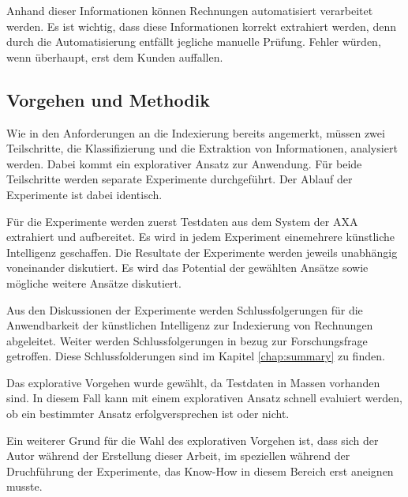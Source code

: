 Anhand dieser Informationen können Rechnungen automatisiert verarbeitet werden. Es ist wichtig, dass diese Informationen korrekt extrahiert werden, denn durch die Automatisierung entfällt jegliche manuelle Prüfung. Fehler würden, wenn überhaupt, erst dem Kunden auffallen. 

\subsection{Vorgehen und Methodik}

Wie in den Anforderungen an die Indexierung bereits angemerkt, müssen zwei Teilschritte, die Klassifizierung und die Extraktion von Informationen, analysiert werden. Dabei kommt ein explorativer Ansatz zur Anwendung. Für beide Teilschritte werden separate Experimente durchgeführt. Der Ablauf der Experimente ist dabei identisch. 

Für die Experimente werden zuerst Testdaten aus dem System der AXA extrahiert und aufbereitet. Es wird in jedem Experiment einemehrere künstliche Intelligenz geschaffen. Die Resultate der Experimente werden jeweils unabhängig voneinander diskutiert. Es wird das Potential der gewählten Ansätze sowie mögliche weitere Ansätze diskutiert.

Aus den Diskussionen der Experimente werden Schlussfolgerungen für die Anwendbarkeit der künstlichen Intelligenz zur Indexierung von Rechnungen abgeleitet. Weiter werden Schlussfolgerungen in bezug zur Forschungsfrage getroffen. Diese Schlussfolderungen sind im Kapitel \ref{chap:summary} zu finden.

Das explorative Vorgehen wurde gewählt, da Testdaten in Massen vorhanden sind. In diesem Fall kann mit einem explorativen Ansatz schnell evaluiert werden, ob ein bestimmter Ansatz erfolgversprechen ist oder nicht.

Ein weiterer Grund für die Wahl des explorativen Vorgehen ist, dass sich der Autor während der Erstellung dieser Arbeit, im speziellen während der Druchführung der Experimente, das Know-How in diesem Bereich erst aneignen musste.
